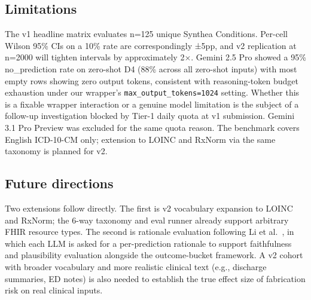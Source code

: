 \subsection{Limitations}\label{limitations}

The v1 headline matrix evaluates n=125 unique Synthea Conditions.
Per-cell Wilson 95\% CIs on a 10\% rate are correspondingly ±5pp,
and v2 replication at n=2000 will tighten intervals by
approximately 2×. Gemini 2.5 Pro showed a 95\% no\_prediction
rate on zero-shot D4 (88\% across all zero-shot inputs) with most
empty rows showing zero output
tokens, consistent with reasoning-token budget exhaustion under
our wrapper's \texttt{max\_output\_tokens=1024} setting. Whether this is
a fixable wrapper interaction or a genuine model limitation is
the subject of a follow-up investigation blocked by Tier-1 daily
quota at v1 submission. Gemini 3.1 Pro Preview was excluded for
the same quota reason. The benchmark covers English ICD-10-CM
only; extension to LOINC and RxNorm via the same taxonomy is
planned for v2.

\subsection{Future directions}\label{future-directions}

Two extensions follow directly. The first is v2 vocabulary
expansion to LOINC and RxNorm; the 6-way taxonomy and eval runner
already support arbitrary FHIR resource types. The second is
rationale evaluation following Li et al.~\autocite{Li2025}, in
which each LLM is asked for a per-prediction rationale to support
faithfulness and plausibility evaluation alongside the
outcome-bucket framework. A v2 cohort with broader vocabulary and
more realistic clinical text (e.g., discharge summaries, ED notes)
is also needed to establish the true effect size of fabrication
risk on real clinical inputs.
